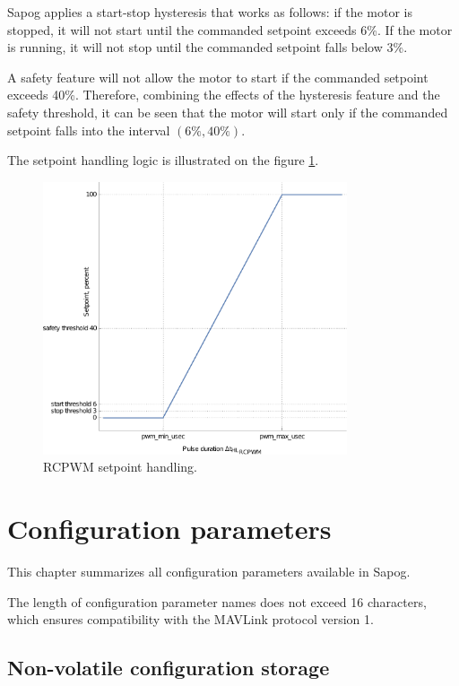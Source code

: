 \documentclass{zubaxdoc}
\begin{document}
Sapog applies a start-stop hysteresis that works as follows: if the motor is stopped, it will not start
until the commanded setpoint exceeds 6\%.
If the motor is running, it will not stop until the commanded setpoint falls below 3\%.

A safety feature will not allow the motor to start if the commanded setpoint exceeds 40\%.
Therefore, combining the effects of the hysteresis feature and the safety threshold,
it can be seen that the motor will start only if the commanded setpoint falls into the interval
$\left(6\%, 40\%\right)$.

The setpoint handling logic is illustrated on the figure \ref{rcpwm_setpoint_handling}.

\begin{figure}[hbt]
    \centering
	\includegraphics[width=0.8\textwidth]{rcpwm_setpoint_handling}
	\caption{RCPWM setpoint handling.
	\label{rcpwm_setpoint_handling}}
\end{figure}

\chapter{Configuration parameters}\label{sec:configuration_parameters}

This chapter summarizes all configuration parameters available in Sapog.

The length of configuration parameter names does not exceed 16 characters,
which ensures compatibility with the MAVLink protocol version 1.

\section{Non-volatile configuration storage}
\end{document}
